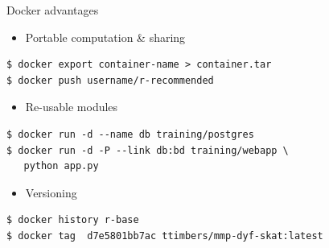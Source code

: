 \documentclass[11pt,xcolor=dvipsnames,presentation]{beamer}
\begin{document}
\begin{frame}[fragile,label=sec-5-0-2]{Docker advantages}
 \begin{itemize}
\item Portable computation \& sharing
\end{itemize}

\begin{verbatim}
$ docker export container-name > container.tar
$ docker push username/r-recommended
\end{verbatim}

\begin{itemize}
\item Re-usable modules
\end{itemize}
\begin{verbatim}
$ docker run -d --name db training/postgres
$ docker run -d -P --link db:bd training/webapp \
   python app.py
\end{verbatim}

\begin{itemize}
\item Versioning
\end{itemize}

\begin{verbatim}
$ docker history r-base
$ docker tag  d7e5801bb7ac ttimbers/mmp-dyf-skat:latest
\end{verbatim}
\end{frame}
\end{document}
